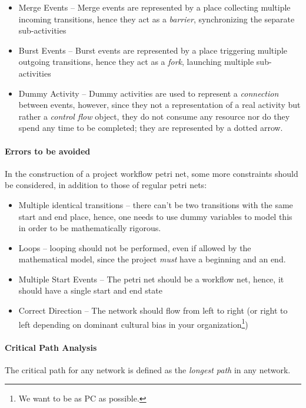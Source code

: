 \documentclass[openright, twoside, twocolumn]{report}
\begin{document}
\begin{itemize}
  \item Merge Events -- Merge events are represented by a place collecting multiple
  incoming transitions, hence they act as a \emph{barrier}, synchronizing the separate sub-activities
  \item Burst Events -- Burst events are represented by a place triggering multiple outgoing
  transitions, hence they act as a \emph{fork}, launching multiple sub-activities
  \item Dummy Activity -- Dummy activities are used to represent a \emph{connection} between events,
  however, since they not a representation of a real activity but rather a \emph{control flow} object, they
  do not consume any resource nor do they spend any time to be completed; they are represented by a dotted arrow.
\end{itemize}

\paragraph{Errors to be avoided}

In the construction of a project workflow petri net, some more constraints should be considered,
in addition to those of regular petri nets:

\begin{itemize}
  \item Multiple identical transitions -- there can't be two transitions with the same start and end place, hence,
  one needs to use dummy variables to model this in order to be mathematically rigorous.
  \item Loops -- looping should not be performed, even if allowed by the mathematical model, since the project \emph{must}
  have a beginning and an end.
  \item Multiple Start Events -- The petri net should be a workflow net, hence, it should have a single start and end state
  \item Correct Direction -- The network should flow from left to right (or right to left depending on dominant cultural bias
  in your organization\footnote{We want to be as PC as possible.})
\end{itemize}

\paragraph{Critical Path Analysis}
The critical path for any network is defined as the \emph{longest path} in any network.
\end{document}
